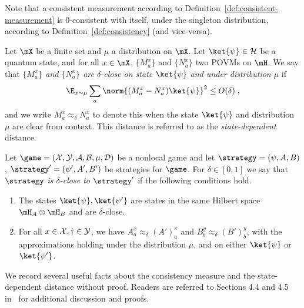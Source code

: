 Note that a consistent measurement according to
Definition~\ref{def:consistent-measurement} is $0$-consistent with itself, under
the singleton distribution, according to Definition~\ref{def:consistency} (and
vice-versa).

\begin{definition}
\hypertarget{000N}{}
\reversemarginpar{}
  \label{def:povm-distance}
	Let $\mX$ be a finite set and $\mu$ a distribution on $\mX$. 
  Let $\ket{\psi} \in \cal{H}$ be a quantum state, and for all $x\in \mX$,
  $\{M^x_a\}$ and $\{N^x_a\}$ two POVMs on $\mH$.
  We say that \emph{$\{M^x_a\}$ and $\{N^x_a\}$ are $\delta$-close on state
    $\ket{\psi}$ and under distribution $\mu$} if
  \begin{equation*}
    \E_{x\sim \mu} \sum_a \norm{ (M^x_a - N^x_a) \ket{\psi} }^2 \leq O(\delta)\;,
  \end{equation*}
  and we write $M^x_a \approx_\delta N^x_a$ to denote this when the state
  $\ket{\psi}$ and distribution $\mu$ are clear from context.
  This distance is referred to as the \emph{state-dependent} distance.
\end{definition}

\begin{definition}
\hypertarget{000P}{}
\reversemarginpar{}
  \label{def:strategy-distance}
  Let $\game = (\cal{X}, \cal{Y}, \cal{A}, \cal{B}, \mu, D)$ be a nonlocal game
  and let $\strategy = (\psi, A, B)$, $\strategy' = (\psi', A', B')$ be 
  strategies for $\game$.
  For $\delta\in[0,1]$ we say that \emph{$\strategy$ is $\delta$-close to
    $\strategy'$} if the following conditions hold.
  \begin{enumerate}
	\item The states $\ket{\psi}, \ket{\psi'}$ are states in the same
    Hilbert space $\mH_A \otimes \mH_B$ and are $\delta$-close.
	\item For all $x \in \cal{X}, y \in \cal{Y}$, we have $A^x_a \approx_\delta
    (A')^x_a$ and $B^y_b \approx_\delta (B')^y_b$, with the approximations
    holding under the distribution $\mu$, and on either $\ket{\psi}$ or
    $\ket{\psi'}$.
  \end{enumerate}
\end{definition}

We record several useful facts about the consistency measure and the
state-dependent distance without proof.
Readers are referred to Sections 4.4 and 4.5 in~\cite{NW19} for additional
discussion and proofs.

